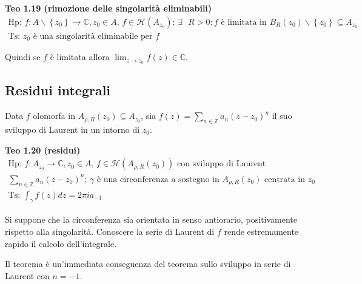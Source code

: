 \documentclass{article}
\begin{document}
\textbf{Teo 1.19 (rimozione delle singolarit\`{a} eliminabili)}%
\begin{gather*}
\text{Hp: }f:A\backslash \left\{ z_{0}\right\} \rightarrow 
\mathbb{C}
,z_{0}\in A\text{, }f\in \mathcal{H}\left( A_{z_{0}}\right) \text{; }\exists 
\text{ }R>0:f\text{ \`{e} limitata in }B_{R}\left( z_{0}\right) \backslash
\left\{ z_{0}\right\} \subseteq A_{z_{0}} \\
\text{Ts: }z_{0}\text{ \`{e} una singolarit\`{a} eliminabile per }f
\end{gather*}

Quindi se $f$ \`{e} limitata allora $\lim_{z\rightarrow z_{0}}f\left(
z\right) \in 
\mathbb{C}
$.

\subsection{Residui integrali}

Data $f$ olomorfa in $A_{\rho ,R}\left( z_{0}\right) \subseteq A_{z_{0}}$,
sia $f\left( z\right) =\sum_{n\in 
\mathbb{Z}
}a_{n}\left( z-z_{0}\right) ^{n}$ il suo sviluppo di Laurent in un intorno
di $z_{0}$.

\textbf{Teo 1.20 (residui)}%
\begin{gather*}
\text{Hp: }f:A_{z_{0}}\rightarrow 
\mathbb{C}
,z_{0}\in A\text{, }f\in \mathcal{H}\left( A_{\rho ,R}\left( z_{0}\right)
\right) \text{ con sviluppo di Laurent } \\
\sum_{n\in 
\mathbb{Z}
}a_{n}\left( z-z_{0}\right) ^{n}\text{; }\gamma \text{ \`{e} una
circonferenza a sostegno in }A_{\rho ,R}\left( z_{0}\right) \text{ centrata
in }z_{0} \\
\text{Ts: }\int_{\gamma }f\left( z\right) dz=2\pi ia_{-1}
\end{gather*}

Si suppone che la circonferenza sia orientata in senso antiorario,
positivamente rispetto alla singolarit\`{a}. Conoscere la serie di Laurent
di $f$ rende estremamente rapido il calcolo dell'integrale.

Il teorema \`{e} un'immediata conseguenza del teorema sullo sviluppo in
serie di Laurent con $n=-1$.
\end{document}
